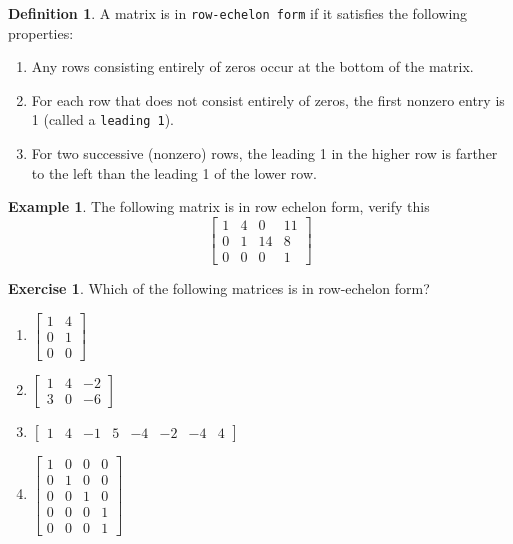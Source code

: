 \documentclass[handout]{beamer}
\theoremstyle{definition}
\newtheorem{exercise}{Exercise}
\newtheorem*{defn}{Definition}
\newtheorem*{exa}{Example}
\renewcommand{\emph}[1]{{\color{blue}\texttt{#1}}}
\begin{document}
\begin{frame}{\insertframenumber}
	\begin{defn}
	A matrix is in \emph{row-echelon form} if it satisfies the following properties:
		\begin{enumerate}[label=\arabic*.]
			\item Any rows consisting entirely of zeros occur at the bottom of the matrix.
			\item For each row that does not consist entirely of zeros, the first nonzero entry is 1 (called a \emph{leading 1}).
			\item For two successive (nonzero) rows, the leading 1 in the higher row is farther to the left than the leading 1 of the lower row.
		\end{enumerate}
	\end{defn}
	\begin{exa}
		The following matrix is in row echelon form, verify this
		\[\left[\begin{array}{rrrr}
		1 & 4 & 0 & 11 \\
		0 & 1 & 14 & 8 \\
		0 & 0 & 0 & 1
		\end{array}\right]\]
	\end{exa}
\end{frame}
\begin{frame}{\insertframenumber}
	\begin{exercise}
		Which of the following matrices is in row-echelon form?
		\begin{enumerate}[label=(\alph*)]
			\item $\left[\begin{array}{rr}
			1 & 4 \\
			0 & 1 \\
			0 & 0
			\end{array}\right]$
			\item $\left[\begin{array}{rrr}
			1 & 4 & -2 \\
			3 & 0 & -6
			\end{array}\right]$
			\item $\left[\begin{array}{rrrrrrrr}
			1 & 4 & -1 & 5 & -4 & -2 & -4 & 4
			\end{array}\right]$
			\item $\left[\begin{array}{rrrr}
				1 & 0 & 0 & 0 \\
				0 & 1 & 0 & 0 \\
				0 & 0 & 1 & 0 \\
				0 & 0 & 0 & 1 \\
				0 & 0 & 0 & 1
			\end{array}\right]$
		\end{enumerate}
	\end{exercise}
\end{frame}
\end{document}
